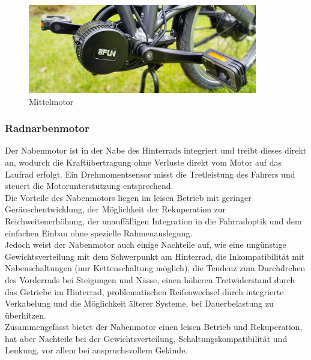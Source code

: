 \begin{figure}[h]
    \centering
    \includegraphics[width=10cm]{images/Mittelmotor-Fahrrad-nachruesten_F01.jpg}
    \caption{Mittelmotor\cite{noauthor_mittelmotor_nodate}}%
    \label{fig:8}
\end{figure}

\subsubsection*{Radnarbenmotor}
Der Nabenmotor ist in der Nabe des Hinterrads integriert und treibt dieses direkt an, wodurch die Kraftübertragung ohne Verluste direkt vom Motor auf das Laufrad erfolgt. Ein Drehmomentsensor misst die Tretleistung des Fahrers und steuert die Motorunterstützung entsprechend.\\

Die Vorteile des Nabenmotors liegen im leisen Betrieb mit geringer Geräuschentwicklung, der Möglichkeit der Rekuperation zur Reichweitenerhöhung, der unauffälligen Integration in die Fahrradoptik und dem einfachen Einbau ohne spezielle Rahmenauslegung.\\

Jedoch weist der Nabenmotor auch einige Nachteile auf, wie eine ungünstige Gewichtsverteilung mit dem Schwerpunkt am Hinterrad, die Inkompatibilität mit Nabenschaltungen (nur Kettenschaltung möglich), die Tendenz zum Durchdrehen des Vorderrads bei Steigungen und Nässe, einen höheren Tretwiderstand durch das Getriebe im Hinterrad, problematischen Reifenwechsel durch integrierte Verkabelung und die Möglichkeit älterer Systeme, bei Dauerbelastung zu überhitzen.\\

Zusammengefasst bietet der Nabenmotor einen leisen Betrieb und Rekuperation, hat aber Nachteile bei der Gewichtsverteilung, Schaltungskompatibilität und Lenkung, vor allem bei anspruchsvollem Gelände.\\

